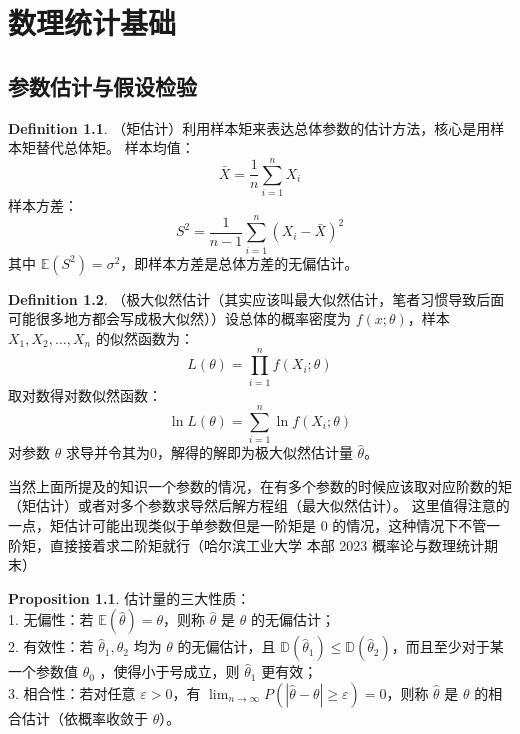 \documentclass[oneside]{book}
\theoremstyle{definition}
\newtheorem{proposition}{Proposition}[section]
\newtheorem{definition}{Definition}[section]
\begin{document}
	\chapter{数理统计基础}
	\section{参数估计与假设检验}
	
	\begin{definition}
		（矩估计）利用样本矩来表达总体参数的估计方法，核心是用样本矩替代总体矩。
		样本均值：
		\[
		\bar{X} = \frac{1}{n}\sum_{i=1}^n X_i
		\]
		样本方差：
		\[
		S^2 = \frac{1}{n-1}\sum_{i=1}^n (X_i - \bar{X})^2
		\]
		其中 \( \mathbb{E}(S^2) = \sigma^2 \)，即样本方差是总体方差的无偏估计。
	\end{definition}
	
	\begin{definition}
		（极大似然估计（其实应该叫最大似然估计，笔者习惯导致后面可能很多地方都会写成极大似然））设总体的概率密度为 \( f(x;\theta) \)，样本 \( X_1,X_2,\dots,X_n \) 的似然函数为：
		\[
		L(\theta) = \prod_{i=1}^n f(X_i;\theta)
		\]
		取对数得对数似然函数：
		\[
		\ln L(\theta) = \sum_{i=1}^n \ln f(X_i;\theta)
		\]
		对参数 \( \theta \) 求导并令其为0，解得的解即为极大似然估计量 \( \hat{\theta} \)。
	\end{definition}
	
	
	当然上面所提及的知识一个参数的情况，在有多个参数的时候应该取对应阶数的矩（矩估计）或者对多个参数求导然后解方程组（最大似然估计）。
这里值得注意的一点，矩估计可能出现类似于单参数但是一阶矩是 0 的情况，这种情况下不管一阶矩，直接接着求二阶矩就行（哈尔滨工业大学 本部 2023 概率论与数理统计期末）
	
	\begin{proposition}
		估计量的三大性质：\\
		1. 无偏性：若 \( \mathbb{E}(\hat{\theta}) = \theta \)，则称 \( \hat{\theta} \) 是 \( \theta \) 的无偏估计；\\
		2. 有效性：若 \( \hat{\theta}_1,\hat{\theta}_2 \) 均为 \( \theta \) 的无偏估计，且 \( \mathbb{D}(\hat{\theta}_1) \leq \mathbb{D}(\hat{\theta}_2) \)，而且至少对于某一个参数值 \(\theta_0\) ，使得小于号成立，则 \( \hat{\theta}_1 \) 更有效；\\
		3. 相合性：若对任意 \( \varepsilon > 0 \)，有 \( \lim_{n\to\infty} P(|\hat{\theta} - \theta| \geq \varepsilon) = 0 \)，则称 \( \hat{\theta} \) 是 \( \theta \) 的相合估计（依概率收敛于 \( \theta \)）。
	\end{proposition}
	
\end{document}
